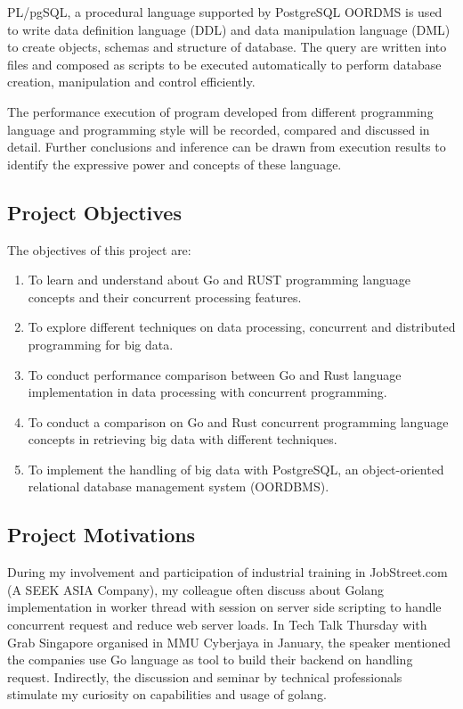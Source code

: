 PL/pgSQL, a procedural language supported by PostgreSQL OORDMS is used to write data definition language (DDL) and data manipulation language (DML) to create objects, schemas and structure of database. The query are written into files and composed as scripts to be executed automatically to perform database creation, manipulation and control efficiently. 

The performance execution of program developed from different programming language and programming style will be recorded, compared and discussed in detail. Further conclusions and inference can be drawn from execution results to identify the expressive power and concepts of these language.

\pagebreak
\subsection{Project Objectives}
The objectives of this project are:


\begin{enumerate}[topsep=0pt,itemsep=-1ex,partopsep=1ex,parsep=1.5ex]

	\item To learn and understand about Go and RUST programming language concepts and their concurrent processing features. 
	\item To explore different techniques on data processing, concurrent and distributed programming for big data.  
	\item To conduct performance comparison between Go and Rust language implementation in data processing with concurrent programming.
	\item To conduct a comparison on Go and Rust concurrent programming language concepts in retrieving big data with different techniques. 
	\item To implement the handling of big data with PostgreSQL, an object-oriented relational database management system (OORDBMS).

\end{enumerate}

\pagebreak

\subsection{Project Motivations}

During my involvement and participation of industrial training in JobStreet.com (A SEEK ASIA Company), my colleague often discuss about Golang implementation in worker thread with session on server side scripting to handle concurrent request and reduce web server loads. In Tech Talk Thursday with Grab Singapore organised in MMU Cyberjaya in January, the speaker mentioned the companies use Go language as tool to build their backend on handling request. Indirectly, the discussion and seminar by technical professionals stimulate my curiosity on capabilities and usage of golang.

